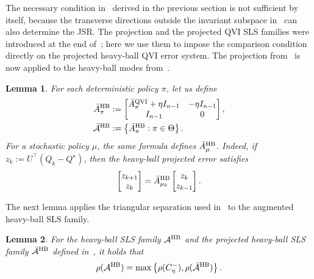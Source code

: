 \documentclass[letterpaper]{article}
\numberwithin{equation}{section}
\newtheorem{lemma}{Lemma}[section]
\begin{document}
The necessary condition in~ derived in the previous section is not sufficient by itself, because the transverse directions outside the invariant subspace in~ can also determine the JSR. The projection and the projected QVI SLS families were introduced at the end of~; here we use them to impose the comparison condition directly on the projected heavy-ball QVI error system. The projection from~ is now applied to the
heavy-ball modes from~.
\begin{lemma}
\label{lem:projected-hb-error-system}
For each deterministic policy $\pi$, let us define
\begin{equation}
\begin{aligned}
\bar A_\pi^{\rm HB}&:=
  \begin{bmatrix}
    \bar A_\pi^{\rm QVI}+\eta I_{n-1}&-\eta I_{n-1}\\
    I_{n-1}&0
  \end{bmatrix},\\
\bar{\mathcal A}^{\rm HB}&:=
  \left\{\bar A_\pi^{\rm HB}:\pi\in\Theta\right\}.
\end{aligned}
\label{eq:projected-hb-family}
\end{equation}
For a stochastic policy $\mu$, the same formula defines $\bar A_\mu^{\rm HB}$.
Indeed, if $z_k:=U^\top(Q_k-Q^\star)$, then the heavy-ball projected error
satisfies
\begin{equation*}
  \begin{bmatrix}z_{k+1}\\z_k\end{bmatrix}
  =\bar A_{\mu_k}^{\rm HB}
  \begin{bmatrix}z_k\\z_{k-1}\end{bmatrix}.
\end{equation*}
\end{lemma}


The next lemma applies the triangular
separation used in~ to the augmented heavy-ball SLS family.
\begin{lemma}
\label{lem:hb-common-eigenvector-projected-jsr-decomposition}
For the heavy-ball SLS family $\mathcal A^{\rm HB}$ and the projected
heavy-ball SLS family $\bar{\mathcal A}^{\rm HB}$ defined in~, it holds that
\begin{equation*}
  \rho(\mathcal A^{\rm HB})
  =
  \max\left\{\rho(C_\eta^-),\rho(\bar{\mathcal A}^{\rm HB})\right\}.
\end{equation*}
\end{lemma}
\end{document}
